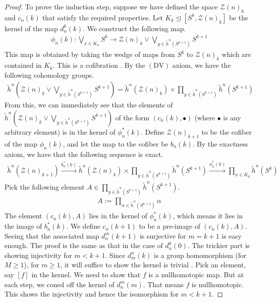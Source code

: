 \documentclass[12pt, notitlepage]{article}
\theoremstyle{definition}
\newcommand{\calz}{\mathcal{Z}}
\newcommand{\redco}{\widetilde{h}}
\newcommand{\dv}{\mathrm{DV}}
\begin{document}
\begin{proof}
  To prove the induction step, suppose we have defined the space $\calz(n)_k$ and $c_n(k)$ that
  satisfy the required properties. Let $K_k \trianglelefteq \left[ S^k, \calz(n)_k \right]$
   be the kernel of the map $d_n^k(k)$.  We construct the following map.
  \begin{align*}
    \phi_n(k): \bigvee_{x \in K_k} S^k \to \calz(n)_k \vee \bigvee_{y \in \redco^n(S^{k+1})} S^{k+1}
  \end{align*}
  This map is obtained by taking the wedge of maps from $S^k$ to $\calz(n)_k$ which are contained in
  $K_k$.  This is a cofibration . By the $(\dv)$ axiom, we have the following cohomology
  groups.
  \begin{align*}
    \redco^n \left( \calz(n)_k \vee \bigvee_{y \in \redco^n(S^{k+1})} S^{k+1} \right) = \redco^n(\calz(n)_k) \times \prod_{y \in \redco^n(S^{k+1})} \redco^n(S^{k+1})
  \end{align*}
  From this, we can immediately see that the elements of
  $\redco^n \left( \calz(n)_k \vee \bigvee_{y \in \redco^n(S^{k+1})} S^{k+1} \right)$ of the form
  $(c_n(k), \bullet)$ (where $\bullet$ is any arbitrary element) is in the kernel of
  $\phi_n^{\ast}(k)$.  Define $\calz(n)_{k+1}$ to be the cofiber of the map $\phi_n(k)$, and let the
  map to the cofiber be $b_n(k)$.  By the exactness axiom, we have that the following sequence is
  exact.
  \begin{align*}
    \redco^n(\calz(n)_{k+1}) \xrightarrow{b_n^{\ast}(k)}  \redco^n(\calz(n)_k) \times \prod_{y \in \redco^n(S^{k+1})} \redco^n(S^{k+1})
    \xrightarrow{\phi_n^{\ast}(k)} \prod_{x \in K_k} \redco^n(S^k)
  \end{align*}
  Pick the following element $A \in \prod_{y \in \redco^n(S^{k+1})} \redco^n(S^{k+1})$.
  \begin{align*}
    A := \prod_{\alpha \in \redco^n(S^{k+1})} \alpha
  \end{align*}
  The element $(c_n(k), A)$ lies in the kernel of $\phi_n^{\ast}(k)$, which means it lies in the
  image of $b_n^{\ast}(k)$. We define $c_n(k+1)$ to be a pre-image of $(c_n(k), A)$. Seeing that the
  associated map $d_n^m(k+1)$ is surjective for $m=k+1$ is easy enough. The proof is the same as
  that in the case of $d_n^0(0)$.
  The trickier part is showing injectivity for $m < k+1$. Since $d_m^n(k)$ is a group homomorphism
  (for $M \geq 1$), for $m \geq 1$, it will suffice to show the kernel is trivial
  .
  Pick an element, say $[f]$ in the kernel. We need to show that $f$ is a nullhomotopic map. But
  at each step, we coned off the kernel of $d_n^m(m)$. That means $f$ is nullhomotopic. This shows
  the injectivity and hence the isomorphism for $m  < k+1$.


\end{proof}
\end{document}
